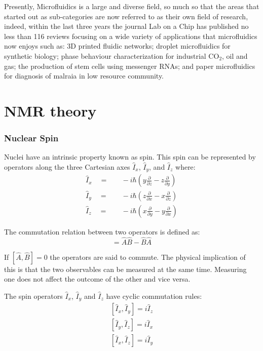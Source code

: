 Presently, Microfluidics is a large and diverse field, so much so that the areas that started out as sub-categories are now referred to as their
own field of research, indeed, within the last three years the journal Lab on a Chip has published no less than 116 reviews focusing on a wide variety of applications
that microfluidics now enjoys such as: 3D printed fluidic networks\citep{kinstlinger20163d}; droplet microfluidics for synthetic biology\citep{gach2017droplet};
phase behaviour characterization for industrial CO$_2$, oil and gas\citep{bao2017microfluidic}; the production of stem cells using messenger RNAs\citep{giulitti2019direct};
and paper microfluidics for diagnosis of malraia in low resource community\citep{reboud2019based}.

\newpage

\section{NMR theory}\label{Quantum}

\subsubsection{Nuclear Spin}\label{Spin}

Nuclei have an intrinsic property known as spin. This spin can be represented by operators
along the three Cartesian axes $\hat{I}_x$, $\hat{I}_y$, and $\hat{I}_z$ where:
\begin{align}
  \hat{I}_x\quad=&\quad-i\hbar(y\frac{\partial}{\partial{z}}-z\frac{\partial}{\partial{y}})\\
  \hat{I}_y\quad=&\quad-i\hbar(z\frac{\partial}{\partial{x}}-x\frac{\partial}{\partial{z}})\\
  \hat{I}_z\quad=&\quad-i\hbar(x\frac{\partial}{\partial{y}}-y\frac{\partial}{\partial{x}})
\end{align}

The commutation relation between two operators is defined as:
\begin{equation}
  [\hat{A},\hat{B}] = \hat{A}\hat{B} - \hat{B}\hat{A}
\end{equation}

If $[\hat{A},\hat{B}] = 0$ the operators are said to commute. The physical implication
of this is that the two observables can be measured at the same time. Measuring one
does not affect the outcome of the other and vice versa.

The spin operators $\hat{I}_x$, $\hat{I}_y$ and $\hat{I}_z$
have cyclic commutation rules:
\begin{align}\label{eqn:commutator}
  [\hat{I}_x,\hat{I}_y] = i\hat{I}_z\\
  [\hat{I}_y,\hat{I}_z] = i\hat{I}_x\\
  [\hat{I}_x,\hat{I}_z] = i\hat{I}_y
\end{align}

